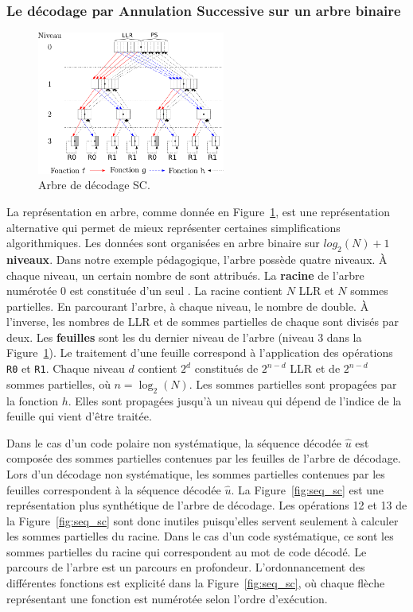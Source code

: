 \subsubsection{Le décodage par Annulation Successive sur un arbre binaire}
\begin{figure}[t]
\centering
\includegraphics[width=0.55\textwidth]{main/ch1_fig/sc}
\caption{Arbre de décodage SC.}
\label{fig:sc}
\end{figure}
La représentation en arbre, comme donnée en Figure~\ref{fig:sc}, est une représentation alternative qui permet de mieux représenter certaines simplifications algorithmiques.
Les données sont organisées en arbre binaire sur $log_2(N) + 1$ \textbf{niveaux}. Dans notre exemple pédagogique, l'arbre possède quatre niveaux.
\`A chaque niveau, un certain nombre de \textbf{\noeuds} sont attribués.
La \textbf{racine} de l'arbre numérotée $0$ est constituée d'un seul \noeud.
La racine contient $N$ LLR et $N$ sommes partielles.
En parcourant l'arbre, à chaque niveau, le nombre de \noeuds double.
\`A l'inverse, les nombres de LLR et de sommes partielles de chaque \noeud sont divisés par deux.
Les \textbf{feuilles} sont les \noeuds du dernier niveau de l'arbre (niveau 3 dans la Figure~\ref{fig:sc}).
Le traitement d'une feuille correspond à l'application des opérations \texttt{R0} et \texttt{R1}.
Chaque niveau $d$ contient $2^d$ \noeuds constitués de $2^{n-d}$ LLR et de $2^{n-d}$ sommes partielles, où $n=\log_2(N)$. 
Les sommes partielles sont propagées par la fonction $h$. Elles sont propagées jusqu'à un niveau qui dépend de l'indice de la feuille qui vient d'être traitée.

Dans le cas d'un code polaire non systématique, la séquence décodée $\hat{u}$ est composée des sommes partielles contenues par les feuilles de l'arbre de décodage.
Lors d'un décodage non systématique, les sommes partielles contenues par les feuilles correspondent à la séquence décodée $\hat{u}$.
La Figure~\ref{fig:seq_sc} est une représentation plus synthétique de l'arbre de décodage.
Les opérations 12 et 13 de la Figure~\ref{fig:seq_sc} sont donc inutiles puisqu'elles servent seulement à calculer les sommes partielles du \noeud racine.
Dans le cas d'un code systématique, ce sont les sommes partielles du \noeud racine qui correspondent au mot de code décodé.
Le parcours de l'arbre est un parcours en profondeur.
L'ordonnancement des différentes fonctions est explicité dans la Figure~\ref{fig:seq_sc}, où chaque flèche représentant une fonction est numérotée selon l'ordre d'exécution.


